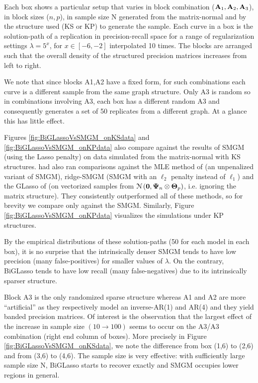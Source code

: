     Each box shows a particular setup that varies in block combination ($\mathbf{A}_1,\mathbf{A}_2,\mathbf{A}_3$), in block sizes ($n,p$), in sample size N generated from the matrix-normal and by the structure used (KS or KP) to generate the sample. Each curve in a box is the solution-path of a replication in precision-recall space for a range of regularization settings $\lambda = 5^x$, for $x \in [-6,-2]$ interpolated 10 times.
    The blocks are arranged such that the overall density of the structured precision matrices increases from left to right.
    
    We note that since blocks A1,A2 have a fixed form, for such combinations each curve is a different sample from the same graph structure.
    Only A3 is random so in combinations involving A3, each box has a different random A3 and consequently generates a set of 50 replicates from a different graph.
    At a glance this has little effect.
    
    Figures \ref{fig:BiGLassoVsSMGM_onKSdata} and \ref{fig:BiGLassoVsSMGM_onKPdata} also compare against the results of SMGM (using the Lasso penalty) on data simulated from the matrix-normal with KS structures.
    \citet{Leng:Sparse12} had also ran comparisons against the MLE method of \citet{Dutilleul:MLE99} (an unpenalized variant of SMGM), ridge-SMGM (SMGM with an $\ell_2$ penalty instead of $\ell_1$) and the GLasso of \citet{Friedman:sparse08} (on vectorized samples from $\mathcal{N} \left( \mathbf{0},  \mathbf{\Psi}_n \otimes \mathbf{\Theta}_p \right)$, i.e. ignoring the matrix structure).
    They consistently outperformed all of these methods, so for brevity we compare only against the SMGM.
    Similarly, Figure \ref{fig:BiGLassoVsSMGM_onKPdata} visualizes the simulations under KP structures.
    
    By the empirical distributions of these solution-paths (50 for each model in each box), it is no surprise that the intrinsically denser SMGM tends to have low precision (many false-positives) for smaller values of $\lambda$.
    On the contrary, BiGLasso tends to have low recall (many false-negatives) due to its intrinsically sparser structure.

    Block A3 is the only randomized sparse structure whereas A1 and A2 are more ``artificial'' as they respectively model an inverse-AR(1) and AR(4) and they yield banded precision matrices.
    Of interest is the observation that the largest effect of the increase in sample size $(10 \rightarrow 100)$ seems to occur on the A3/A3 combination (right end column of boxes).
    More precisely in Figure \ref{fig:BiGLassoVsSMGM_onKSdata}, we note the difference from box (1,6) to (2,6) and from (3,6) to (4,6). The sample size is very effective: with sufficiently large sample size N, BiGLasso starts to recover exactly and SMGM occupies lower regions in general.
    
